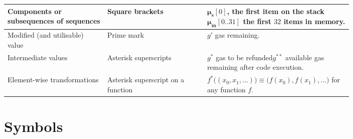 \documentclass[9pt,oneside]{amsart}
\begin{document}
\begin{tabular}{L{0.25\linewidth}L{0.25\linewidth}L{0.3\linewidth}}
\midrule
Components or subsequences of sequences & Square brackets & $\boldsymbol{\mu}_\mathbf{s}[0]$, the first item on the stack\newline $\boldsymbol{\mu}_\mathbf{m}[0..31]$ the first $32$ items in memory. \\
\midrule
Modified (and utilisable) value & Prime mark & $g'$ gas remaining. \\
\midrule
Intermediate values & Asterisk superscripts & $g^*$ gas to be refunded\newline $g^{**}$ available gas remaining after code execution.\\
\midrule
Element-wise transformations & Asterisk superscript on a function & $f^*\big((x_0, x_1, ...) \big) \equiv \big( f(x_0), f(x_1), ... \big)$ for any function $f$. \\
\bottomrule
\end{tabular}

\endcenter

\vspace{7pt}
\section{Symbols}
\end{document}
